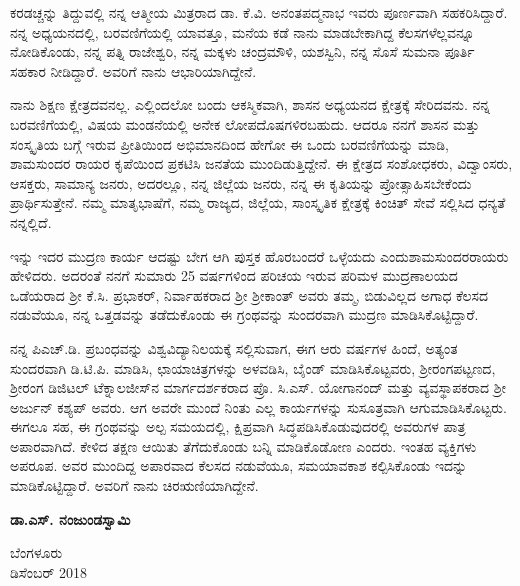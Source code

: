ಕರಡಚ್ಚನ್ನು ತಿದ್ದುವಲ್ಲಿ ನನ್ನ ಆತ್ಮೀಯ ಮಿತ್ರರಾದ ಡಾ. ಕೆ.ವಿ. ಅನಂತಪದ್ಮನಾಭ ಇವರು ಪೂರ್ಣವಾಗಿ ಸಹಕರಿಸಿದ್ದಾರೆ. ನನ್ನ ಅಧ್ಯಯನದಲ್ಲಿ, ಬರವಣಿಗೆಯಲ್ಲಿ ಯಾವತ್ತೂ, ಮನೆಯ ಕಡೆ ನಾನು ಮಾಡಬೇಕಾಗಿದ್ದ ಕೆಲಸಗಳೆಲ್ಲವನ್ನೂ ನೋಡಿಕೊಂಡು, ನನ್ನ ಪತ್ನಿ ರಾಜೇಶ್ವರಿ, ನನ್ನ ಮಕ್ಕಳು ಚಂದ್ರಮೌಳಿ, ಯಶಸ್ವಿನಿ, ನನ್ನ ಸೊಸೆ ಸುಮನಾ ಪೂರ್ತಿ ಸಹಕಾರ ನೀಡಿದ್ದಾರೆ. ಅವರಿಗೆ ನಾನು ಆಭಾರಿಯಾಗಿದ್ದೇನೆ. 

ನಾನು ಶಿಕ್ಷಣ ಕ್ಷೇತ್ರದವನಲ್ಲ. ಎಲ್ಲಿಂದಲೋ ಬಂದು ಆಕಸ್ಮಿಕವಾಗಿ, ಶಾಸನ ಅಧ್ಯಯನದ ಕ್ಷೇತ್ರಕ್ಕೆ ಸೇರಿದವನು. ನನ್ನ ಬರವಣಿಗೆಯಲ್ಲಿ, ವಿಷಯ ಮಂಡನೆಯಲ್ಲಿ ಅನೇಕ ಲೋಪದೊಷಗಳಿರಬಹುದು. ಆದರೂ ನನಗೆ ಶಾಸನ ಮತ್ತು ಸಂಸ್ಕೃತಿಯ ಬಗ್ಗೆ ಇರುವ ಪ್ರೀತಿಯಿಂದ ಅಭಿಮಾನದಿಂದ ಹೇಗೋ ಈ ಒಂದು ಬರವಣಿಗೆಯನ್ನು ಮಾಡಿ, ಶಾಮಸುಂದರ ರಾಯರ ಕೃಪೆಯಿಂದ ಪ್ರಕಟಿಸಿ ಜನತೆಯ ಮುಂದಿಡುತ್ತಿದ್ದೇನೆ. ಈ ಕ್ಷೇತ್ರದ ಸಂಶೋಧಕರು, ವಿದ್ವಾಂಸರು, ಆಸಕ್ತರು, ಸಾಮಾನ್ಯ ಜನರು, ಅದರಲ್ಲೂ, ನನ್ನ ಜಿಲ್ಲೆಯ ಜನರು, ನನ್ನ ಈ ಕೃತಿಯನ್ನು ಪ್ರೋತ್ಸಾಹಿಸಬೇಕೆಂದು ಪ್ರಾರ್ಥಿಸುತ್ತೇನೆ. ನಮ್ಮ ಮಾತೃಭಾಷೆಗೆ, ನಮ್ಮ ರಾಜ್ಯದ, ಜಿಲ್ಲೆಯ, ಸಾಂಸ್ಕೃತಿಕ ಕ್ಷೇತ್ರಕ್ಕೆ ಕಿಂಚಿತ್​ ಸೇವೆ ಸಲ್ಲಿಸಿದ ಧನ್ಯತೆ ನನ್ನಲ್ಲಿದೆ.

ಇನ್ನು ಇದರ ಮುದ್ರಣ ಕಾರ್ಯ ಆದಷ್ಟು ಬೇಗ ಆಗಿ ಪುಸ್ತಕ ಹೊರಬಂದರೆ ಒಳ್ಳೆಯದು ಎಂದು\break ಶಾಮಸುಂದರರಾಯರು ಹೇಳಿದರು. ಅದರಂತೆ ನನಗೆ ಸುಮಾರು 25 ವರ್ಷಗಳಿಂದ ಪರಿಚಯ ಇರುವ ಪರಿಮಳ ಮುದ್ರಣಾಲಯದ ಒಡೆಯರಾದ ಶ‍್ರೀ ಕೆ.ಸಿ. ಪ್ರಭಾಕರ್​, ನಿರ್ವಾಹಕರಾದ ಶ‍್ರೀ ಶ‍್ರೀಕಾಂತ್​ ಅವರು ತಮ್ಮ, ಬಿಡು\break ವಿಲ್ಲದ ಅಗಾಧ ಕೆಲಸದ ನಡುವೆಯೂ, ನನ್ನ ಒತ್ತಡವನ್ನು ತಡೆದುಕೊಂಡು ಈ ಗ್ರಂಥವನ್ನು ಸುಂದರವಾಗಿ ಮುದ್ರಣ ಮಾಡಿಸಿಕೊಟ್ಟಿದ್ದಾರೆ.

ನನ್ನ ಪಿಎಚ್​.ಡಿ. ಪ್ರಬಂಧವನ್ನು ವಿಶ್ವವಿದ್ಯಾನಿಲಯಕ್ಕೆ ಸಲ್ಲಿಸುವಾಗ, ಈಗ ಆರು ವರ್ಷಗಳ ಹಿಂದೆ, ಅತ್ಯಂತ ಸುಂದರವಾಗಿ ಡಿ.ಟಿ.ಪಿ. ಮಾಡಿಸಿ, ಛಾಯಾಚಿತ್ರಗಳನ್ನು ಅಳವಡಿಸಿ, ಬೈಂಡ್​ ಮಾಡಿಸಿಕೊಟ್ಟವರು, ಶ‍್ರೀರಂಗಪಟ್ಟಣದ, ಶ‍್ರೀರಂಗ ಡಿಜಿಟಲ್​ ಟೆಕ್ನಾಲಜೀಸ್​ನ ಮಾರ್ಗದರ್ಶಕರಾದ ಪ್ರೊ. ಸಿ.ಎಸ್​. ಯೋಗಾನಂದ್​ ಮತ್ತು ವ್ಯವಸ್ಥಾಪಕರಾದ ಶ‍್ರೀ ಅರ್ಜುನ್​ ಕಶ್ಯಪ್ ಅವರು. ಆಗ ಅವರೇ ಮುಂದೆ ನಿಂತು ಎಲ್ಲ ಕಾರ್ಯಗಳನ್ನು ಸುಸೂತ್ರವಾಗಿ ಆಗುಮಾಡಿಸಿಕೊಟ್ಟರು. ಈಗಲೂ ಸಹ, ಈ ಗ್ರಂಥವನ್ನು ಅಲ್ಪ ಸಮಯದಲ್ಲಿ, ಕ್ಷಿಪ್ರವಾಗಿ ಸಿದ್ಧಪಡಿಸಿಕೊಡುವುದರಲ್ಲಿ ಅವರುಗಳ ಪಾತ್ರ ಅಪಾರವಾಗಿದೆ. ಕೇಳಿದ ತಕ್ಷಣ ಆಯಿತು ತೆಗೆದುಕೊಂಡು ಬನ್ನಿ ಮಾಡಿಕೊಡೋಣ ಎಂದರು. ಇಂತಹ ವ್ಯಕ್ತಿಗಳು ಅಪರೂಪ. ಅವರ ಮುಂದಿದ್ದ ಅಪಾರವಾದ ಕೆಲಸದ ನಡುವೆಯೂ, ಸಮಯಾವಕಾಶ ಕಲ್ಪಿಸಿಕೊಂಡು ಇದನ್ನು ಮಾಡಿಕೊಟ್ಟಿದ್ದಾರೆ. ಅವರಿಗೆ ನಾನು ಚಿರಋಣಿಯಾಗಿದ್ದೇನೆ.

\begin{flushright}
\textbf{ಡಾ.ಎಸ್​. ನಂಜುಂಡಸ್ವಾಮಿ}
\end{flushright}

\noindent
ಬೆಂಗಳೂರು \\ ಡಿಸೆಂಬರ್​ 2018

